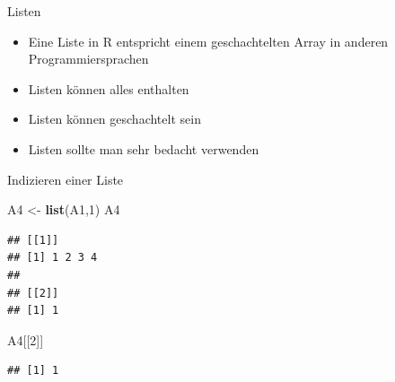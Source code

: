 \documentclass[
  ignorenonframetext,
]{beamer}
\newenvironment{Shaded}{\begin{snugshade}}{\end{snugshade}}
\newcommand{\DecValTok}[1]{\textcolor[rgb]{0.27,0.67,0.26}{#1}}
\newcommand{\KeywordTok}[1]{\textcolor[rgb]{0.26,0.66,0.93}{\textbf{#1}}}
\newcommand{\NormalTok}[1]{\textcolor[rgb]{0.74,0.68,0.62}{#1}}
\newcommand{\StringTok}[1]{\textcolor[rgb]{0.02,0.61,0.04}{#1}}
\providecommand{\tightlist}{%
  \setlength{\itemsep}{0pt}\setlength{\parskip}{0pt}}
\begin{document}
\begin{frame}{Listen}
\protect\hypertarget{listen}{}

\begin{itemize}
\tightlist
\item
  Eine Liste in R entspricht einem geschachtelten Array in anderen
  Programmiersprachen
\item
  Listen können alles enthalten
\item
  Listen können geschachtelt sein
\item
  Listen sollte man sehr bedacht verwenden
\end{itemize}

\end{frame}

\begin{frame}[fragile]{Indizieren einer Liste}
\protect\hypertarget{indizieren-einer-liste}{}

\begin{Shaded}
\begin{Highlighting}[]
\NormalTok{A4 <-}\StringTok{ }\KeywordTok{list}\NormalTok{(A1,}\DecValTok{1}\NormalTok{)}
\NormalTok{A4}
\end{Highlighting}
\end{Shaded}

\begin{verbatim}
## [[1]]
## [1] 1 2 3 4
## 
## [[2]]
## [1] 1
\end{verbatim}

\begin{Shaded}
\begin{Highlighting}[]
\NormalTok{A4[[}\DecValTok{2}\NormalTok{]]}
\end{Highlighting}
\end{Shaded}

\begin{verbatim}
## [1] 1
\end{verbatim}

\end{frame}
\end{document}
